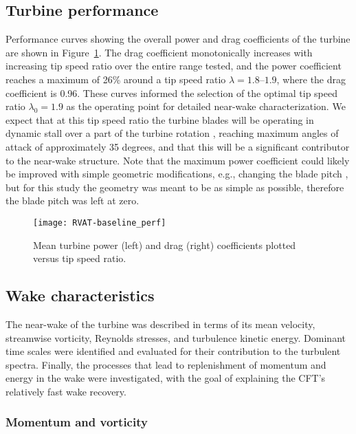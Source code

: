 \subsection{Turbine performance}

Performance curves showing the overall power and drag coefficients of the
turbine are shown in Figure~\ref{fig:RVAT-baseline-perf}. The drag coefficient
monotonically increases with increasing tip speed ratio over the entire range
tested, and the power coefficient reaches a maximum of 26\% around a tip speed
ratio $\lambda=1.8$--$1.9$, where the drag coefficient is 0.96. These curves
informed the selection of the optimal tip speed ratio $\lambda_0 = 1.9$ as the
operating point for detailed near-wake characterization. We expect that at this
tip speed ratio the turbine blades will be operating in dynamic stall over a
part of the turbine rotation \cite{Scheurich2011}, reaching maximum angles of
attack of approximately 35 degrees, and that this will be a significant
contributor to the near-wake structure. Note that the maximum power coefficient
could likely be improved with simple geometric modifications, e.g., changing the
blade pitch \cite{Fiedler2009}, but for this study the geometry was meant to be
as simple as possible, therefore the blade pitch was left at zero.

\begin{figure}
    \centering
    \texttt{[image: RVAT-baseline\_perf]}
    \caption{Mean turbine power (left) and drag (right) coefficients plotted
        versus tip speed ratio.}
    \label{fig:RVAT-baseline-perf}
\end{figure}


\subsection{Wake characteristics}

The near-wake of the turbine was described in terms of its mean velocity,
streamwise vorticity, Reynolds stresses, and turbulence kinetic energy. Dominant
time scales were identified and evaluated for their contribution to the turbulent
spectra. Finally, the processes that lead to replenishment of momentum and
energy in the wake were investigated, with the goal of explaining the CFT's
relatively fast wake recovery.


\subsubsection{Momentum and vorticity}

